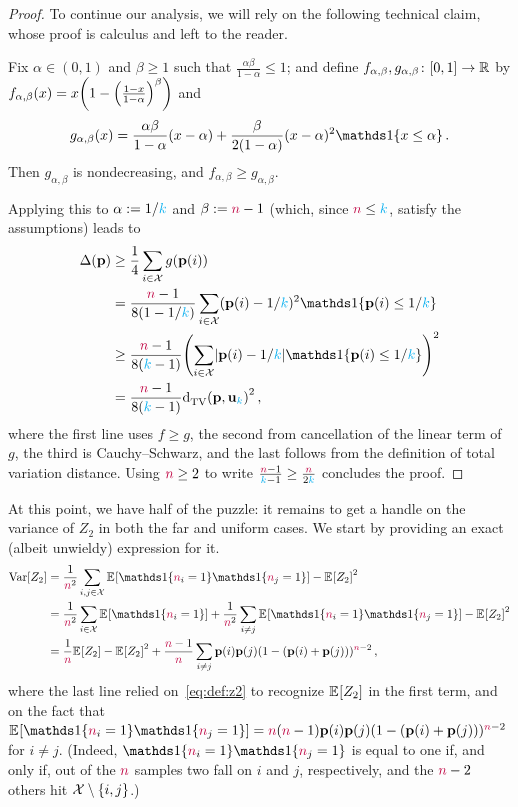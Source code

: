 \begin{proof}
To continue our analysis, we will rely on the following technical claim, whose proof is calculus and left to the reader.
\begin{claim}
Fix $\alpha\in(0,1)$ and $\beta \geq 1$ such that $\frac{\alpha\beta}{1-\alpha} \leq 1$; and define $f_{\alpha,\beta},g_{\alpha,\beta}\colon [0,1]\to\mathbb{R}$ by
$
f_{\alpha,\beta}(x) = x\Paren{1-\Paren{\frac{1-x}{1-\alpha}}^\beta}$ and 
\[
g_{\alpha,\beta}(x) = \frac{\alpha\beta}{1-\alpha}(x-\alpha) + \frac{\beta}{2(1-\alpha)} (x-\alpha)^2 \indic{x\leq \alpha}\,.
\]
Then $g_{\alpha,\beta}$ is nondecreasing, and $f_{\alpha,\beta}\geq g_{\alpha,\beta}$.
\end{claim}
Applying this to $\alpha:= 1/{\textcolor{cyan}{k}}$ and $\beta := {\textcolor{purple}{n}}-1$ (which, since ${\textcolor{purple}{n}}\leq {\textcolor{cyan}{k}}$, satisfy the assumptions) leads to
\begin{align*}
  \Delta(\p) 
  &%
  \geq \frac{1}{4}\sum_{i\in\domain} g(\p(i)) \\
  &= \frac{\ns-1}{8(1-1/\ab)} \sum_{i\in\domain} (\p(i)-1/\ab)^2\indic{\p(i)\leq 1/\ab} \\
  &\geq \frac{\ns-1}{8(\ab-1)} \Paren{\sum_{i\in\domain} \abs{\p(i)-1/\ab}\indic{\p(i)\leq 1/\ab}}^2 \\
  &= \frac{\ns-1}{8(\ab-1)} \totalvardist{\p}{\uniform_\ab}^2\,,
\end{align*}
where the first line uses $f\geq g$, the second from cancellation of the linear term of $g$, the third is Cauchy--Schwarz, and the last follows from the definition of total variation distance. Using ${\textcolor{purple}{n}} \geq 2$ to write $\frac{{\textcolor{purple}{n}}-1}{{\textcolor{cyan}{k}}-1}\geq \frac{{\textcolor{purple}{n}}}{2{\textcolor{cyan}{k}}}$ concludes the proof.
\end{proof}
At this point, we have half of the puzzle: it remains to get a handle on the variance of $Z_2$ in both the far and uniform cases. We start by providing an exact (albeit unwieldy) expression for it.%
\begin{align*}
\Var[Z_2] 
&= \frac{1}{\ns^2}\sum_{i,j\in\domain} \bEE{\indic{\ns_i=1}\indic{\ns_j=1}} - \bEE{Z_2}^2  \\
&= \frac{1}{\ns^2}\sum_{i\in\domain} \bEE{\indic{\ns_i=1}} + \frac{1}{\ns^2}\sum_{i\neq j} \bEE{\indic{\ns_i=1}\indic{\ns_j=1}} - \bEE{Z_2}^2 \\
&= \frac{1}{\ns}\bEE{Z_2}- \bEE{Z_2}^2 + \frac{\ns-1}{\ns}\sum_{i\neq j} \p(i)\p(j)(1-(\p(i)+\p(j)))^{\ns-2}\,, %
\end{align*}
where the last line relied on~\cref{eq:def:z2} to recognize $\bEE{Z_2}$ in the first term, and on the fact that $\bEE{\indic{\ns_i=1}\indic{\ns_j=1}} = \ns(\ns-1)\p(i)\p(j)(1-(\p(i)+\p(j)))^{\ns-2}$ for $i\neq j$. (Indeed, $\indic{\ns_i=1}\indic{\ns_j=1}$ is equal to one if, and only if, out of the ${\textcolor{purple}{n}}$ samples two fall on $i$ and $j$, respectively, and the ${\textcolor{purple}{n}}-2$ others hit $\mathcal{X}\setminus\{i,j\}$.)

